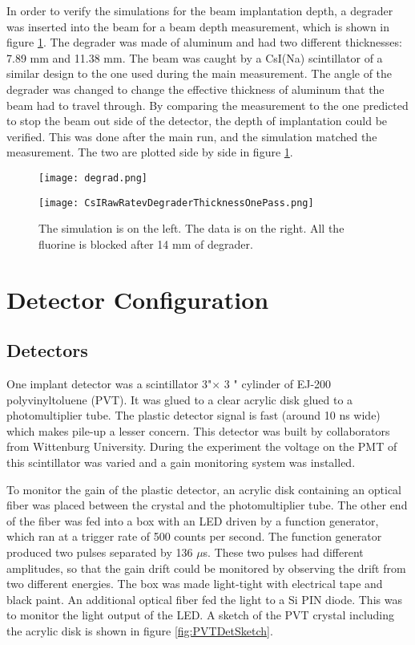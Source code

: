 \documentclass[../MaxHughesThesis.tex]{subfiles}
\begin{document}
In order to verify the simulations for the beam implantation depth, a degrader was inserted into the beam for a beam depth measurement, which is shown in figure \ref{fig:degraderdata}.
The degrader was made of aluminum and had two different thicknesses: 7.89 mm and 11.38 mm. 
The beam was caught by a CsI(Na) scintillator of a similar design to the one used during the main measurement.
The angle of the degrader was changed to change the effective thickness of aluminum that the beam had to travel through. 
By comparing the measurement to the one predicted to stop the beam out side of the detector, the depth of implantation could be verified. 
This was done after the main run, and the simulation matched the measurement.
The two are plotted side by side in figure \ref{fig:degraderdata}.

\begin{figure}
    \centering
    \begin{minipage}{0.50\textwidth}
	\centerline{\texttt{[image: degrad.png]}}
    \end{minipage}\hfill
    \begin{minipage}{0.50\textwidth}
	\centerline{\texttt{[image: CsIRawRatevDegraderThicknessOnePass.png]}}
    \end{minipage}
	\caption{The simulation is on the left.
		 The data is on the right.
		 All the fluorine is blocked after 14 mm of degrader.}
	\label{fig:degraderdata}
\end{figure}


\section{Detector Configuration}

\subsection{Detectors}
One implant detector was a scintillator 3"\diameter $\times$  3 " cylinder of EJ-200 polyvinyltoluene (PVT).
It was glued to a clear acrylic disk glued to a photomultiplier tube.
The plastic detector signal is fast (around 10 ns wide) which makes pile-up a lesser concern.
This detector was built by collaborators from Wittenburg University.
During the experiment the voltage on the PMT of this scintillator was varied and a gain monitoring system was installed.

To monitor the gain of the plastic detector, an acrylic disk containing an optical fiber was placed between the crystal and the photomultiplier tube. 
The other end of the fiber was fed into a box with an LED driven by a function generator, which ran at a trigger rate of 500 counts per second. 
The function generator produced two pulses separated by 136 $\mu$s.
These two pulses had different amplitudes, so that the gain drift could be monitored by observing the drift from two different energies.
The box was made light-tight with electrical tape and black paint.
An additional optical fiber fed the light to a Si PIN diode.
This was to monitor the light output of the LED.
A sketch of the PVT crystal including the acrylic disk is shown in figure \ref{fig:PVTDetSketch}.
\end{document}
